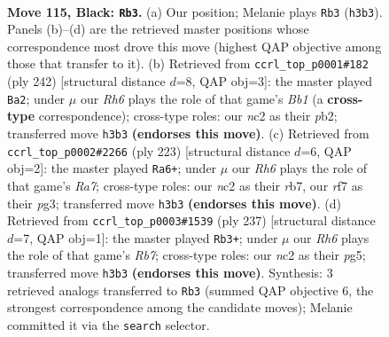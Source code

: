 \documentclass[11pt]{article}
\begin{document}
\clearpage

\begin{figure}[p]\centering
\begin{subfigure}{0.46\textwidth}\centering
\resizebox{\linewidth}{!}{%
\newchessgame
\chessboard[
  setfen={8/5R2/8/3k2K1/6P1/7r/2N5/8 b - - 14 115},
  showmover=false,
  pgfstyle=straightmove, color=movearrow, markmove={h3-b3}
]}
\caption{}
\end{subfigure}\hfill
\begin{subfigure}{0.46\textwidth}\centering
\resizebox{\linewidth}{!}{%
\newchessgame
\chessboard[
  setfen={8/8/7K/p7/k7/8/1p6/1B6 w - - 0 122},
  showmover=false,
  pgfstyle=straightmove, color=movearrow, markmove={b1-a2}
]}
\caption{}
\end{subfigure}
\\[4pt]
\begin{subfigure}{0.46\textwidth}\centering
\resizebox{\linewidth}{!}{%
\newchessgame
\chessboard[
  setfen={6k1/1R6/6K1/6P1/8/6P1/r7/8 b - - 20 112},
  showmover=false,
  pgfstyle=straightmove, color=movearrow, markmove={a2-a6}
]}
\caption{}
\end{subfigure}\hfill
\begin{subfigure}{0.46\textwidth}\centering
\resizebox{\linewidth}{!}{%
\newchessgame
\chessboard[
  setfen={8/6k1/4R3/6P1/6P1/6K1/1r6/8 b - - 12 119},
  showmover=false,
  pgfstyle=straightmove, color=movearrow, markmove={b2-b3}
]}
\caption{}
\end{subfigure}
\caption{\textbf{Move 115, Black: \texttt{Rb3}.} (a) Our position; Melanie plays \texttt{Rb3} (\texttt{h3b3}). Panels (b)--(d) are the retrieved master positions whose correspondence most drove this move (highest QAP objective among those that transfer to it). (b) Retrieved from \texttt{ccrl\_top\_p0001\#182} (ply 242) [structural distance $d$=8, QAP obj=3]: the master played \texttt{Ba2}; under $\mu$ our \emph{Rh6} plays the role of that game's \emph{Bb1} (a \textbf{cross-type} correspondence); cross-type roles: our \emph{n}c2 as their \emph{p}b2; transferred move \texttt{h3b3} \textbf{(endorses this move)}. (c) Retrieved from \texttt{ccrl\_top\_p0002\#2266} (ply 223) [structural distance $d$=6, QAP obj=2]: the master played \texttt{Ra6+}; under $\mu$ our \emph{Rh6} plays the role of that game's \emph{Ra7}; cross-type roles: our \emph{n}c2 as their \emph{r}b7, our \emph{r}f7 as their \emph{p}g3; transferred move \texttt{h3b3} \textbf{(endorses this move)}. (d) Retrieved from \texttt{ccrl\_top\_p0003\#1539} (ply 237) [structural distance $d$=7, QAP obj=1]: the master played \texttt{Rb3+}; under $\mu$ our \emph{Rh6} plays the role of that game's \emph{Rb7}; cross-type roles: our \emph{n}c2 as their \emph{p}g5; transferred move \texttt{h3b3} \textbf{(endorses this move)}. Synthesis: 3 retrieved analogs transferred to \texttt{Rb3} (summed QAP objective 6, the strongest correspondence among the candidate moves); Melanie committed it via the \texttt{search} selector.}
\label{fig:thought-m229}
\end{figure}
\end{document}
